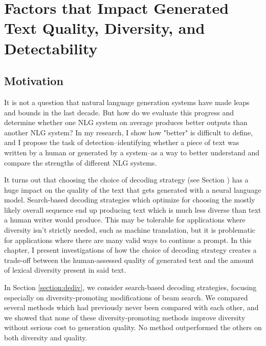 \chapter{Factors that Impact Generated Text Quality, Diversity, and Detectability}
\label{chap:decoding}

\section{Motivation}
It is not a question that natural language generation systems have made leaps and bounds in the last decade.
But how do we evaluate this progress and determine whether one NLG system on average produces better outputs than another NLG system?
In my research, I show how "better" is difficult to define, and I propose the task of detection--identifying whether a piece of text was written by a human or generated by a system--as a way to better understand and compare the strengths of different NLG systems. 

It turns out that choosing the choice of decoding strategy (see Section \TODO{}) has a huge impact on the quality of the text that gets generated with a neural language model.
Search-based decoding strategies which optimize for choosing the mostly likely overall sequence end up producing text which is much less diverse than text a human writer would produce.
This may be tolerable for applications where diversity isn't strictly needed, such as machine translation, but it is problematic for applications where there are many valid ways to continue a prompt.
In this chapter, I present investigations of how the choice of decoding strategy creates a trade-off between the human-assessed quality of generated text and the amount of lexical diversity present in said text.

In Section \ref{section:dediv}, we consider search-based decoding strategies, focusing especially on diversity-promoting modifications of beam search.
We compared several methods which had previously never been compared with each other, and we showed that none of these diversity-promoting methods improve diversity without serious cost to generation quality.
No method outperformed the others on both diversity and quality.

